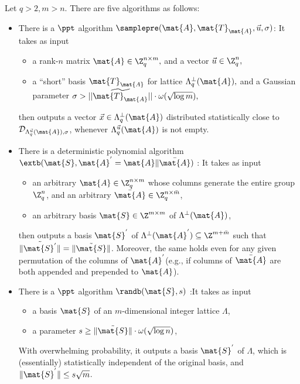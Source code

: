 \begin{lemma} \label{lem:samp}
Let $q>2, m>n.$ There are five algorithms as follows:
\begin{itemize}
 \item There is a $\ppt$  algorithm $\samplepre(\mat{A}, \mat{T}_{\mat{A}}, \vec{u}, \sigma)$: It takes as input
\begin{itemize}
\item a rank-$n$ matrix $\mat{A}\in\Z_q^{n\times m},$ and a vector $\vec{u}\in\Z_q^n,$
\item a ``short'' basis $\mat{T}_{\mat{A}}$ for lattice $\Lambda_q^{\bot}(\mat{A}),$ and a Gaussian parameter $\sigma > ||\widetilde{\mat{T}_{\mat{A}}}||\cdot\omega(\sqrt{\log m}),$
\end{itemize}
then outputs a vector $\vec{x} \in \Lambda^{\perp}_{q}(\mat{A})$ distributed statistically close to $\mathcal{D}_{\Lambda^{\vec{u}}_{q}(\mat{A}),\sigma}$, whenever $\Lambda^{\vec{u}}_{q}(\mat{A})$ is not empty.



 \item There is a deterministic polynomial algorithm $\extb(\mat{S}, \mat{A}^{'}=\mat{A}\| \bar{\mat{A}})$ : It takes as input
\begin{itemize}
\item an arbitrary $\mat{A} \in \Z^{n \times m}_{q}$ whose columns generate the entire group $\Z^{n}_{q}$, and an arbitrary $\bar{\mat{A}} \in \Z^{n \times \bar{m}}_{q}$,
\item an arbitrary basis $\mat{S} \in \Z^{m \times m}$ of $\Lambda^{\bot}(\mat{A})$,
\end{itemize}
then outputs a basis $\mat{S}^{'}$ of $\Lambda^{\bot}(\mat{A}^{'}) \subseteq \Z^{m+\bar{m}}$ such that $\|\tilde{\mat{S}^{'}}\|=\|\tilde{\mat{S}}\|$. Moreover, the same holds even for any given permutation of the columns of $\mat{A}^{'}$(e.g., if columns of $\bar{\mat{A}}$ are both appended and prepended to $\mat{A}$).


 \item There is a $\ppt$ algorithm $\randb(\mat{S}, s)$ :It takes as input
\begin{itemize}
\item a basis $\mat{S}$ of an $m$-dimensional integer lattice $\Lambda$,
\item a parameter $s\geq \| \tilde{\mat{S}} \| \cdot \omega(\sqrt{\log n})$,
\end{itemize}
With overwhelming probability, it outputs a basis $\mat{S}^{'}$ of $\Lambda$, which is (essentially) statistically independent of the original basis, and $\| \mat{S}^{'} \|\leq s\sqrt{m}$.






\end{itemize}
\end{lemma}
